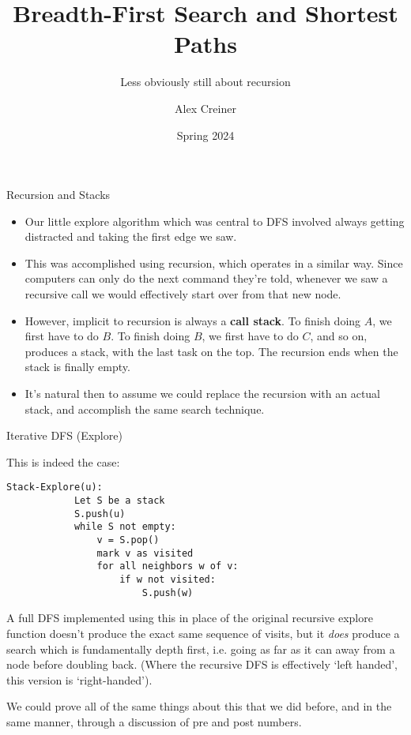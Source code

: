 \documentclass{beamer}
\title{Breadth-First Search and Shortest Paths}
\subtitle{Less obviously still about recursion}
\author{Alex Creiner}
\institute{Boston College}
\date{Spring 2024}
\begin{document}
\titlepage
\begin{frame}{Recursion and Stacks}
    \begin{itemize}
        \item Our little explore algorithm which was central to DFS involved always getting distracted and taking the first edge we saw. 
        \item This was accomplished using recursion, which operates in a similar way. Since computers can only do the next command they're told, whenever we saw a recursive call we would effectively start over from that new node. 
        \item However, implicit to recursion is always a \textbf{call stack}. To finish doing $A$, we first have to do $B$. To finish doing $B$, we first have to do $C$, and so on, produces a stack, with the last task on the top. The recursion ends when the stack is finally empty. 
        \item It's natural then to assume we could replace the recursion with an actual stack, and accomplish the same search technique.
    \end{itemize}
\end{frame}

\begin{frame}[fragile]{Iterative DFS (Explore)}
    \begin{itemize}
        {\small \item This is indeed the case:}
    \end{itemize}
    \begin{lstlisting}[basicstyle=\small]
        Stack-Explore(u):
            Let S be a stack
            S.push(u)
            while S not empty:
                v = S.pop()
                mark v as visited
                for all neighbors w of v:
                    if w not visited:
                        S.push(w)
    \end{lstlisting}
    \begin{itemize}
        {\small \item A full DFS implemented using this in place of the original recursive explore function doesn't produce the exact same sequence of visits, but it \emph{does} produce a search which is fundamentally depth first, i.e. going as far as it can away from a node before doubling back. (Where the recursive DFS is effectively `left handed', this version is `right-handed').
        \item We could prove all of the same things about this that we did before, and in the same manner, through a discussion of pre and post numbers. }
    \end{itemize}
\end{frame}
\end{document}

